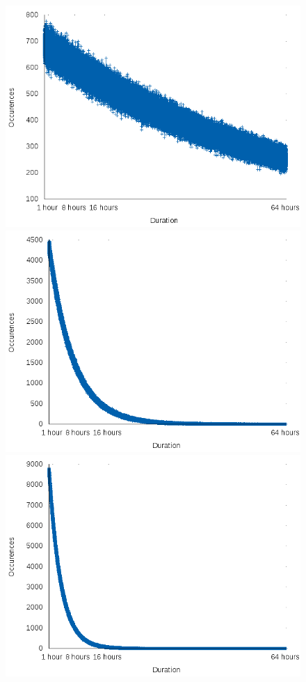 \documentclass{scrreprt}
\begin{document}
\begin{figure}[!htb]
\centering
\begin{minipage}{.33\textwidth}
  \centering
  \includegraphics[width=.9\linewidth]{durationslambda1.png}
\end{minipage}%
\begin{minipage}{.33\textwidth}
  \centering
  \includegraphics[width=.9\linewidth]{durationslambda10.png}
\end{minipage}
\begin{minipage}{.33\textwidth}
  \centering
  \includegraphics[width=.9\linewidth]{durationslambda20.png}

\end{minipage}
\end{figure}
\end{document}
